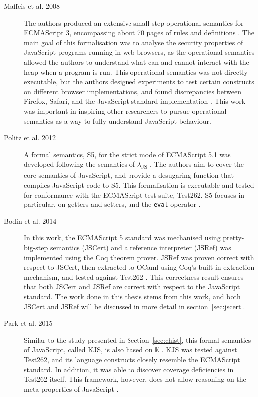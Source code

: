 \documentclass[a4paper,11pt,twoside]{report}
\begin{document}
\begin{description}
\item[Maffeis et al. 2008] The authors produced an extensive small step operational semantics for ECMAScript 3, encompassing about 70 pages of rules and definitions \cite{Maffeis:2008}. The main goal of this formalisation was to analyse the security properties of JavaScript programs running in web browsers, as the operational semantics allowed the authors to understand what can and cannot interact with the heap when a program is run. This operational semantics was not directly executable, but the authors designed experiments to test certain constructs on different browser implementations, and found discrepancies between Firefox, Safari, and the JavaScript standard implementation \cite{Maffeis:2008}. This work was important in inspiring other researchers to pursue operational semantics as a way to fully understand JavaScript behaviour.

\item[Politz et al. 2012] A formal semantics, S5, for the strict mode of ECMAScript 5.1 was developed following the semantics of $\lambda$\textsubscript{JS} \cite{Guha:2010}. The authors aim to cover the core semantics of JavaScript, and provide a desugaring function that compiles JavaScript code to S5. This formalisation is executable and tested for conformance with the ECMAScript test suite, Test262. S5 focuses in particular, on getters and setters, and the \texttt{eval} operator \cite{Politz:2012}.

\item[Bodin et al. 2014] In this work, the ECMAScript 5 standard was mechanised using pretty-big-step semantics (JSCert) and a reference interpreter (JSRef) was implemented using the Coq theorem prover. JSRef was proven correct with respect to JSCert, then extracted to OCaml using Coq's built-in extraction mechanism, and tested against Test262 \cite{Bodin:2014}. This correctness result ensures that both JSCert and JSRef are correct with respect to the JavaScript standard. The work done in this thesis stems from this work, and both JSCert and JSRef will be discussed in more detail in section~\ref{sec:jscert}.

\item[Park et al. 2015] Similar to the study presented in Section~\ref{sec:chist}, this formal semantics of JavaScript, called KJS, is also based on $\mathbb{K}$ \cite{k-primer-2013-v32}. KJS was tested against Test262, and its language constructs closely resemble the ECMAScript standard. In addition, it was able to discover coverage deficiencies in Test262 itself. This framework, however, does not allow reasoning on the meta-properties of JavaScript \cite{Park:2015}.
\end{description}
\end{document}

